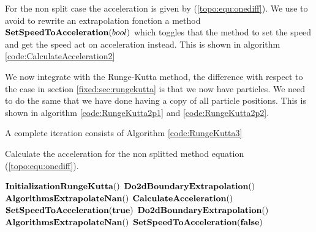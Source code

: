 For the non split case the acceleration is given by (\ref{topo:equ:onediff}).
We use to avoid to rewrite an extrapolation fonction a method $\mathop{\textbf{SetSpeedToAcceleration}}(bool)$
which toggles that the method to set the speed and get the speed act on acceleration instead.
This is shown in algorithm \ref{code:CalculateAcceleration2}

We now integrate with the Runge-Kutta method, the difference with respect to the case in section \ref{fixed:sec:rungekutta}
is that we now have particles. We need to do the same that we have done having a copy of all particle positions.
This is shown in algorithm \ref{code:RungeKutta2p1} and \ref{code:RungeKutta2p2}.

A complete iteration consists of Algorithm \ref{code:RungeKutta3}

\begin{algorithm}
\caption{Calculate the acceleration for the non splitted method equation (\ref{topo:equ:onediff}).}
\label{code:CalculateAcceleration2}
\begin{algorithmic}[1]
	\State $\mathop{\textbf{InitializationRungeKutta}}()$
	\State $\mathop{\textbf{Do2dBoundaryExtrapolation}}()$
	\State $\mathop{\textbf{AlgorithmsExtrapolateNan}}()$
	\State $\mathop{\textbf{CalculateAcceleration}}()$
	\State $\mathop{\textbf{SetSpeedToAcceleration}}(\mathop{\textbf{true}})$
	\State $\mathop{\textbf{Do2dBoundaryExtrapolation}}()$
	\State $\mathop{\textbf{AlgorithmsExtrapolateNan}}()$
	\State $\mathop{\textbf{SetSpeedToAcceleration}}(\mathop{\textbf{false}})$
\EndProcedure
        \end{algorithmic}
\end{algorithm}


